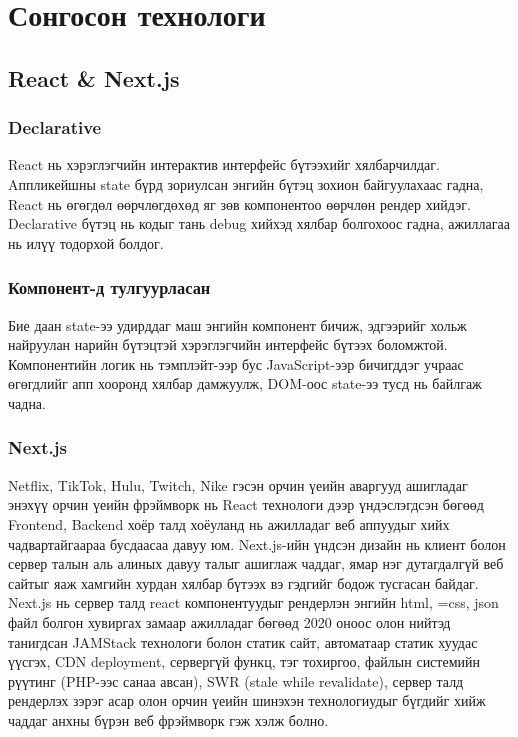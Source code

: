 \section{Сонгосон технологи}
\subsection{React \& Next.js}
\subsubsection{Declarative}
React нь хэрэглэгчийн интерактив интерфейс бүтээхийг хялбарчилдаг. Aппликейшны state бүрд зориулсан энгийн бүтэц зохион байгуулахаас гадна, React нь өгөгдөл өөрчлөгдөхөд яг зөв компонентоо өөрчлөн рендер хийдэг. Declarative бүтэц нь кодыг тань debug хийхэд хялбар болгохоос гадна, ажиллагаа нь илүү тодорхой болдог.

\subsubsection{Компонент-д тулгуурласан}
Бие даан state-ээ удирддаг маш энгийн компонент бичиж, эдгээрийг хольж найруулан нарийн бүтэцтэй хэрэглэгчийн интерфейс бүтээх боломжтой.
Компонентийн логик нь тэмплэйт-ээр бус JavaScript-ээр бичигддэг учраас өгөгдлийг апп хооронд хялбар дамжуулж, DOM-оос state-ээ тусд нь байлгаж чадна.

\subsubsection{Next.js}
Netflix, TikTok, Hulu, Twitch, Nike гэсэн орчин үеийн аваргууд ашигладаг энэхүү орчин үеийн фрэймворк нь React технологи дээр үндэслэгдсэн бөгөөд Frontend, Backend хоёр талд хоёуланд нь ажилладаг веб аппуудыг хийх чадвартайгаараа бусдаасаа давуу юм. Next.js-ийн үндсэн дизайн нь клиент болон сервер талын аль алиных давуу талыг ашиглаж чаддаг, ямар нэг дутагдалгүй веб сайтыг яаж хамгийн хурдан хялбар бүтээх вэ гэдгийг бодож тусгасан байдаг. Next.js нь сервер талд react компонентуудыг рендерлэн энгийн html, =css, json файл болгон хувиргах замаар ажилладаг бөгөөд 2020 оноос олон нийтэд танигдсан JAMStack технологи болон статик сайт, автоматаар статик хуудас үүсгэх, CDN deployment, сервергүй функц, тэг тохиргоо, файлын системийн рүүтинг (PHP-ээс санаа авсан), SWR (stale while revalidate), сервер талд рендерлэх зэрэг асар олон орчин үеийн шинэхэн технологиудыг бүгдийг хийж чаддаг анхны бүрэн веб фрэймворк гэж хэлж болно.

